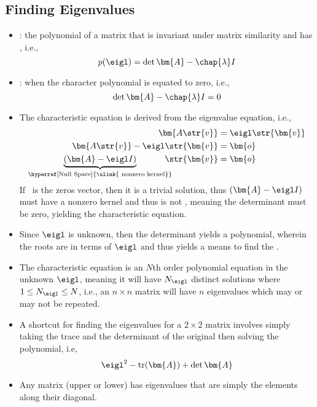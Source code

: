 \begin{itemize}
  \subsection{Finding Eigenvalues}\label{Eigenvalues}
  \begin{itemize}
    \item {}: the polynomial of a matrix that is invariant under matrix similarity and has , i.e.,
    \[%
    p(\eigl) = \det{\bm{A}-\chap{\lambda} I}
    \]%
    \item {}: when the character polynomial is equated to zero, i.e.,
    \[%
    \det{\bm{A}-\chap{\lambda} I} = 0
    \]%
    \item The characteristic equation is derived from the eigenvalue equation, i.e.,
    \begin{align*}
      \bm{A\str{v}} &= \eigl \str{\bm{v}} \\
      \bm{A\str{v}} - \eigl \str{\bm{v}} &= \bm{o} \\
      \underbrace{(\bm{A} - \eigl I )}_{\text{\hyperref[Null Space]{\ulink{ nonzero kernel}}}} \hspace{-10pt}\str{\bm{v}} &= \bm{o}
    \end{align*}
    If \eigv~is the zeros vector, then it is a trivial solution, thus \((\bm{A} - \eigl I )\) must have a nonzero kernel and thus is not \hyperref[Matrix Inverse]{}, meaning the determinant must be zero, yielding the characteristic equation.
    \item Since \(\eigl \) is unknown, then the determinant yields a polynomial, wherein the roots are in terms of \(\eigl \) and thus yields a means to find the .
    \item The characteristic equation is an \(N\)th order polynomial equation in the unknown \(\eigl \), meaning it will have \(N_{\eigl }\) distinct solutions where \(1 \leq N_{\eigl } \leq N \), i.e.,  an \(n \times n\) matrix will have \(n\) eigenvalues which may or may not be repeated.
    \item A shortcut for finding the eigenvalues for a \(2\times 2\) matrix involves simply taking the trace and the determinant of the original then solving the polynomial, i.e,
    \[%
    \eigl^2 - \operatorname{tr}(\bm{A}) + \det{\bm{A}}
    \]%
    \item Any \hyperref[Diagonal and Triagnular Matrices]{} matrix (upper or lower) has eigenvalues that are simply the elements along their diagonal.
  \end{itemize}
    

\end{itemize}
